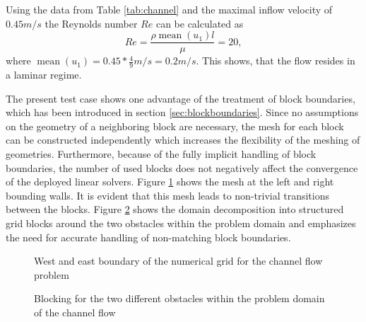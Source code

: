 Using the data from Table \ref{tab:channel} and the maximal inflow velocity of $0.45m/s$ the Reynolds number \(Re\) can be calculated as
\begin{displaymath}
  Re = \frac{\rho \operatorname{mean}(u_1) l}{\mu} = 20,
\end{displaymath}
where \(\operatorname{mean}(u_1) = 0.45*\frac{4}{9} m/s = 0.2 m/s\). This shows, that the flow resides in a laminar regime.

The present test case shows one advantage of the treatment of block boundaries, which has been introduced in section \ref{sec:blockboundaries}. Since no assumptions on the geometry of a neighboring block are necessary, the mesh for each block can be constructed independently which increases the flexibility of the meshing of geometries. Furthermore, because of the fully implicit handling of block boundaries, the number of used blocks does not negatively affect the convergence of the deployed linear solvers. Figure \ref{fig:channel1} shows the mesh at the left and right bounding walls. It is evident that this mesh leads to non-trivial transitions between the blocks. Figure \ref{fig:blocking} shows the domain decomposition into structured grid blocks around the two obstacles within the problem domain and emphasizes the need for accurate handling of non-matching block boundaries.

\begin{figure}
  \centering
  
  \caption{West and east boundary of the numerical grid for the channel flow problem}
  \label{fig:channel1}
\end{figure}

%  

\begin{figure}
   \centering
    \hfill
    \caption{Blocking for the two different obstacles within the problem domain of the channel flow}
    \label{fig:blocking}
\end{figure}

